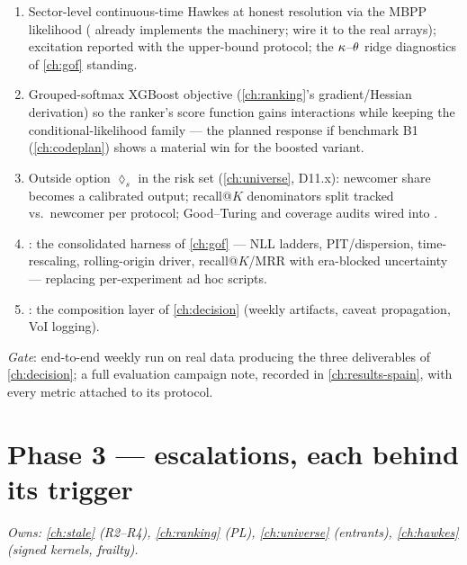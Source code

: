 \begin{enumerate}[label=P2.\arabic*,leftmargin=3.2em]
\item Sector-level continuous-time Hawkes at honest resolution via the
MBPP likelihood ( already implements the machinery;
wire it to the real arrays); excitation reported with the
upper-bound protocol; the $\kappa$--$\theta$ ridge diagnostics of
\cref{ch:gof} standing.
\item Grouped-softmax XGBoost objective (\cref{ch:ranking}'s
gradient/Hessian derivation) so the ranker's score function gains
interactions while keeping the conditional-likelihood family --- the
planned response if benchmark B1 (\cref{ch:codeplan}) shows a material
win for the boosted variant.
\item Outside option $\lozenge_s$ in the risk set (\cref{ch:universe},
D11.x): newcomer share becomes a calibrated output; recall@$K$
denominators split tracked vs.\ newcomer per protocol; Good--Turing and
coverage audits wired into .
\item {}: the consolidated harness of \cref{ch:gof} ---
NLL ladders, PIT/dispersion, time-rescaling, rolling-origin driver,
recall@$K$/MRR with era-blocked uncertainty --- replacing per-experiment
ad hoc scripts.
\item {}: the composition layer of \cref{ch:decision}
(weekly artifacts, caveat propagation, VoI logging).
\end{enumerate}

\emph{Gate}: end-to-end weekly run on real data producing the three
deliverables of \cref{ch:decision}; a full evaluation campaign note,
recorded in \cref{ch:results-spain}, with every metric attached to
its protocol.

\section{Phase 3 --- escalations, each behind its trigger}\label{ch13:sec:phase3}

\emph{Owns: \cref{ch:stale} (R2--R4), \cref{ch:ranking} (PL),
\cref{ch:universe} (entrants), \cref{ch:hawkes} (signed kernels,
frailty).}

